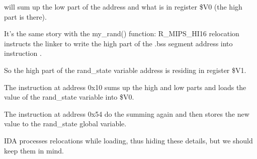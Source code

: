 \SW will sum up the low part of the address and what is in register \$V0 (the high part is there).

It's the same story with the my\_rand() function: R\_MIPS\_HI16 relocation instructs the linker to write the high part
of the .bss segment address into instruction \LUI.

So the high part of the rand\_state variable address is residing in register \$V1.

The \LW instruction at address 0x10 sums up the high and low parts and loads the value of the rand\_state 
variable into \$V0.

The \SW instruction at address 0x54 do the summing again and then stores the new value 
to the rand\_state global variable.

IDA processes relocations while loading, thus hiding these details, but we should keep them in mind.

